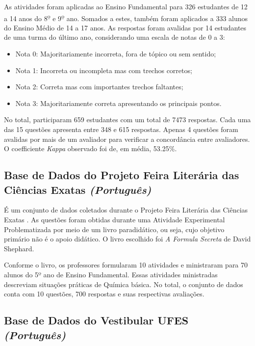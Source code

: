 As atividades foram aplicadas ao Ensino Fundamental para 326 estudantes de 12 a 14 anos do 8\textsuperscript{\b{o}} e 9\textsuperscript{\b{o}} ano. Somados a estes, também foram aplicados a 333 alunos do Ensino Médio de 14 a 17 anos. As respostas foram avalidas por 14 estudantes de uma turma do último ano, considerando uma escala de notas de 0 a 3:

\begin{itemize}
\item Nota 0: Majoritariamente incorreta, fora de tópico ou sem sentido;
\item Nota 1: Incorreta ou incompleta mas com trechos corretos;
\item Nota 2: Correta mas com importantes trechos faltantes;
\item Nota 3: Majoritariamente correta apresentando os principais pontos.
\end{itemize}

No total, participaram 659 estudantes com um total de 7473 respostas. Cada uma das 15 questões apresenta entre 348 e 615 respostas. Apenas 4 questões foram avalidas por mais de um avaliador para verificar a concordância entre avaliadores. O coefficiente \textit{Kappa} observado foi de, em média, 53.25\%.


\subsection{Base de Dados do Projeto Feira Literária das Ciências Exatas \textit{(Português)}}
\label{findes-db}

É um conjunto de dados coletados durante o Projeto Feira Literária das Ciências Exatas \cite{nascimento2020}. As questões foram obtidas durante uma Atividade Experimental Problematizada por meio de um livro paradidático, ou seja, cujo objetivo primário não é o apoio didático. O livro escolhido foi \textit{A Formula Secreta} de David Shephard. 

Conforme o livro, os professores formularam 10 atividades e ministraram para 70 alunos do 5º ano de Ensino Fundamental. Essas atividades ministradas descreviam situações práticas de Química básica. No total, o conjunto de dados conta com 10 questões, 700 respostas e suas respectivas avaliações.


\subsection{Base de Dados do Vestibular UFES \textit{(Português)}}
\label{vest-ufes-db}

